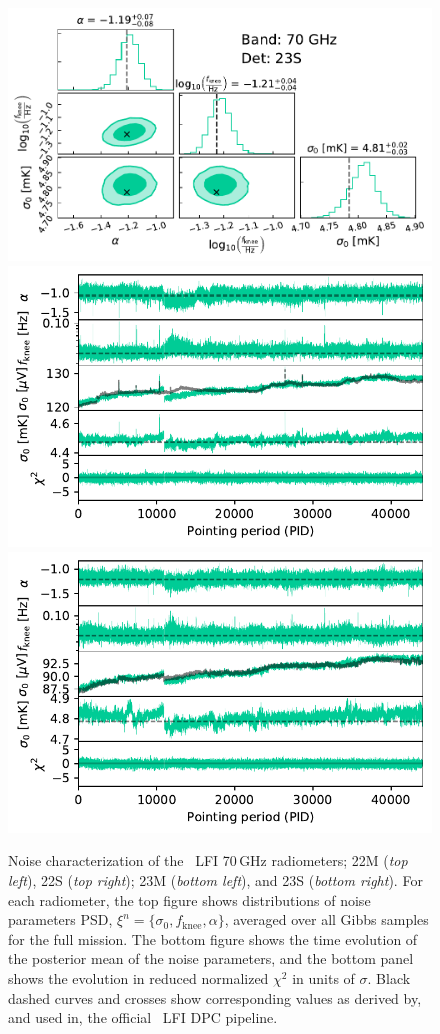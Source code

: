 \documentclass{aa}
\begin{document}
\begin{figure}[p]
\begin{center}
                \includegraphics[width=0.495\linewidth]{figs/corner_band_070_det_12_mean_new.pdf}\\
                \includegraphics[width=0.495\linewidth]{figs/xi_vs_pid_band_070_det_11_mean_new.pdf}
                \includegraphics[width=0.495\linewidth]{figs/xi_vs_pid_band_070_det_12_mean_new.pdf}
                 \vspace*{-5.4mm}            
        \end{center}
        
        \caption{Noise characterization of the \Planck\ LFI 70\,GHz
                radiometers; 22M (\emph{top left}), 22S (\emph{top right}); 23M
                (\emph{bottom left}), and 23S (\emph{bottom right}). For each
                radiometer, the top figure shows distributions of noise parameters
                PSD, $\xi^n = \{\sigma_0, f_\mathrm{knee}, \alpha\}$, averaged
                over all Gibbs samples for the full mission. The bottom figure
                shows the time evolution of the posterior mean of the noise
                parameters, and the bottom panel shows the evolution in reduced
                normalized $\chi^2$ in units of $\sigma$. Black dashed curves and crosses show corresponding values as derived by, and used in, the
                official \Planck\ LFI DPC pipeline.
                \label{fig:xi_prop_70_3}}
\end{figure}
\end{document}
